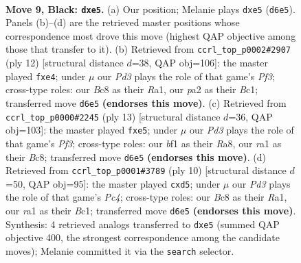 \documentclass[11pt]{article}
\begin{document}
\clearpage

\begin{figure}[p]\centering
\begin{subfigure}{0.46\textwidth}\centering
\resizebox{\linewidth}{!}{%
\newchessgame
\chessboard[
  setfen={r1bqkb1r/1p2pppp/pnnp4/4P3/3P4/5NP1/PP3P1P/RNBQKB1R b kq - 1 9},
  showmover=false,
  pgfstyle=straightmove, color=movearrow, markmove={d6-e5}
]}
\caption{}
\end{subfigure}\hfill
\begin{subfigure}{0.46\textwidth}\centering
\resizebox{\linewidth}{!}{%
\newchessgame
\chessboard[
  setfen={rnbqkb1r/pp3ppp/5n2/3p4/3Pp3/2N2PP1/PP2P2P/R1BQKBNR w KQkq - 1 7},
  showmover=false,
  pgfstyle=straightmove, color=movearrow, markmove={f3-e4}
]}
\caption{}
\end{subfigure}
\\[4pt]
\begin{subfigure}{0.46\textwidth}\centering
\resizebox{\linewidth}{!}{%
\newchessgame
\chessboard[
  setfen={r1bqkbnr/pp4pp/2n1pp2/3pP3/3P4/5NP1/PP3P1P/RNBQKB1R b KQkq - 0 7},
  showmover=false,
  pgfstyle=straightmove, color=movearrow, markmove={f6-e5}
]}
\caption{}
\end{subfigure}\hfill
\begin{subfigure}{0.46\textwidth}\centering
\resizebox{\linewidth}{!}{%
\newchessgame
\chessboard[
  setfen={rnbqkb1r/pp3ppp/4pn2/3p4/2PN4/2N5/PP2PPPP/R1BQKB1R w KQkq - 0 6},
  showmover=false,
  pgfstyle=straightmove, color=movearrow, markmove={c4-d5}
]}
\caption{}
\end{subfigure}
\caption{\textbf{Move 9, Black: \texttt{dxe5}.} (a) Our position; Melanie plays \texttt{dxe5} (\texttt{d6e5}). Panels (b)--(d) are the retrieved master positions whose correspondence most drove this move (highest QAP objective among those that transfer to it). (b) Retrieved from \texttt{ccrl\_top\_p0002\#2907} (ply 12) [structural distance $d$=38, QAP obj=106]: the master played \texttt{fxe4}; under $\mu$ our \emph{Pd3} plays the role of that game's \emph{Pf3}; cross-type roles: our \emph{B}c8 as their \emph{R}a1, our \emph{p}a2 as their \emph{B}c1; transferred move \texttt{d6e5} \textbf{(endorses this move)}. (c) Retrieved from \texttt{ccrl\_top\_p0000\#2245} (ply 13) [structural distance $d$=36, QAP obj=103]: the master played \texttt{fxe5}; under $\mu$ our \emph{Pd3} plays the role of that game's \emph{Pf3}; cross-type roles: our \emph{b}f1 as their \emph{R}a8, our \emph{r}a1 as their \emph{B}c8; transferred move \texttt{d6e5} \textbf{(endorses this move)}. (d) Retrieved from \texttt{ccrl\_top\_p0001\#3789} (ply 10) [structural distance $d$=50, QAP obj=95]: the master played \texttt{cxd5}; under $\mu$ our \emph{Pd3} plays the role of that game's \emph{Pc4}; cross-type roles: our \emph{B}c8 as their \emph{R}a1, our \emph{r}a1 as their \emph{B}c1; transferred move \texttt{d6e5} \textbf{(endorses this move)}. Synthesis: 4 retrieved analogs transferred to \texttt{dxe5} (summed QAP objective 400, the strongest correspondence among the candidate moves); Melanie committed it via the \texttt{search} selector.}
\label{fig:thought-m17}
\end{figure}
\end{document}
